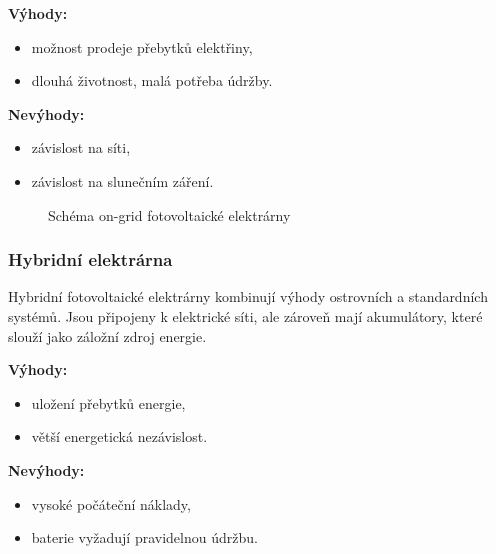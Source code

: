 \begin{multicols}{2}
    \textbf{Výhody:}
    \begin{itemize}[leftmargin=*]
        \item možnost prodeje přebytků elektřiny,
        \item dlouhá životnost, malá potřeba údržby.
    \end{itemize}
    
    \columnbreak
    
    \textbf{Nevýhody:}
    \begin{itemize}[leftmargin=*]
        \item závislost na síti,
        \item závislost na slunečním záření.
    \end{itemize}
\end{multicols}


\begin{figure}[H]
    \centering
    \caption{Schéma on-grid fotovoltaické elektrárny}
    \label{fig:ongrid_schema}
    \end{figure}


\subsubsection{Hybridní elektrárna}

Hybridní fotovoltaické elektrárny kombinují výhody ostrovních a standardních systémů.
Jsou připojeny k elektrické síti, ale zároveň mají akumulátory, které slouží jako záložní zdroj energie.

\begin{multicols}{2}
    \textbf{Výhody:}
    \begin{itemize}[leftmargin=*]
        \item uložení přebytků energie,
        \item větší energetická nezávislost.
    \end{itemize}
    
    \columnbreak
    
    \textbf{Nevýhody:}
    \begin{itemize}[leftmargin=*]
        \item vysoké počáteční náklady,
        \item baterie vyžadují pravidelnou údržbu.
    \end{itemize}

\end{multicols}


